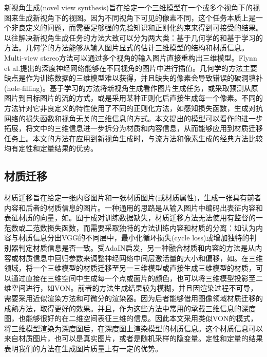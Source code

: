 \documentclass[UTF8,openany,AutoFakeBold,AutoFakeSlant,cs4size]{ctexbook}
\begin{document}
新视角生成(novel view synthesis)旨在给定一个三维模型在一个或多个视角下的视图来生成新视角下的视图。因为不同视角下可见的像素不同，这个任务本质上是一个非良定义的问题，而需要足够强的先验知识和正则化约束来得到可接受的结果。以往解决新视角生成任务的方法大致可以分为两大类：基于几何学的和基于学习的方法。几何学的方法能够从输入图片显式的估计三维模型的结构和材质信息。Multi-view stereo\cite{Furukawa:2015:MST:2864699.2864700}方法可以通过多个视角的输入图片直接重构出三维模型。Flynn et al.\cite{7780964}提出的深度神经网络能够在不同视角的图片中进行插值。几何学的方法主要缺点是作为训练数据的三维模型难以获得，并且缺失的像素会导致错误的破洞填补(hole-filling)。基于学习的方法将新视角生成看作图片生成任务，或采取预测从原图片到目标图片的流\cite{Zhou2016ViewSB, sun2018multiview, olszewski2019tbn}的方式，或是采用某种正则化后直接生成每一个像素\cite{TDB16a, Huang_2017_ICCV, VIGAN, Park2017TransformationGroundedIG}。不同的方法针对它非良定义的特性使用了不同的正则化方法，如感知损失函数\cite{olszewski2019tbn}，生成对抗网络的损失函数\cite{Huang_2017_ICCV}和视角无关的三维信息\cite{VIGAN}的方式。本文提出的模型可以看作\cite{VIGAN}的进一步拓展，将文中的三维信息进一步拆分为材质和内容信息，从而能够应用到材质迁移任务上。本文的方法在应用到新视角生成时，与流方法和像素生成的经典方法比较均有定性和定量结果的优势。

\subsection{材质迁移}

材质迁移旨在给定一张内容图片和一张材质图片(或材质属性)，生成一张具有前者内容和后者的材质信息的图片。一种通用的思路是从输入图片中编码出表征内容和表征材质的向量，如\cite{zheng2019joint, BeautyGlow, Li2018BeautyGANIF, Wu2019DisentanglingCA}。囿于成对训练数据缺失，材质迁移方法无法使用有监督的一范数或二范数损失函数，而需要采取独特的方法训练内容和材质的分离：如认为内容与材质信息分出VGG的不同层中\cite{7780634}，最小化循环损失(cycle loss)\cite{Lu2017ConditionalCF}或增加独特的判别器判定材质信息是否一致\cite{pix2pixSC2019, ma2017pose}。受AdaIN\cite{huang2017adain}启发，另一种融合材质和内容的方法是从内容或材质信息中回归参数来调整神经网络中间层激活量的大小和偏移，如\cite{zhu2019sean, park2019SPADE}。在三维领域，将一个三维模型的材质迁移至另一三维模型或直接生成三维模型的材质，可以通过直接在三维空间中生成每一个点或面片的颜色\cite{cmrKanazawa18}，也可以将三维模型投影至二维空间进行，如VON\cite{VON}。前者的方法生成结果较为模糊，并且因渲染过程不可导，需要采用近似渲染方法和可微分的渲染器\cite{Kato_2018_CVPR}。因为后者能够借用图像领域材质迁移的成熟方法，取得更好的效果。并且，作为这些方法中常用的承载三维信息的深度图，也能够很好的在二维空间表征三维的信息。因此本文采用类似VON的模式，将三维模型渲染为深度图后，在深度图上渲染模型的材质信息。这个材质信息可以来自材质图片，也可以是真实图片，或者是随机采样的隐变量。定性和定量的结果表明我们的方法在生成图片质量上有一定的优势。
\end{document}
